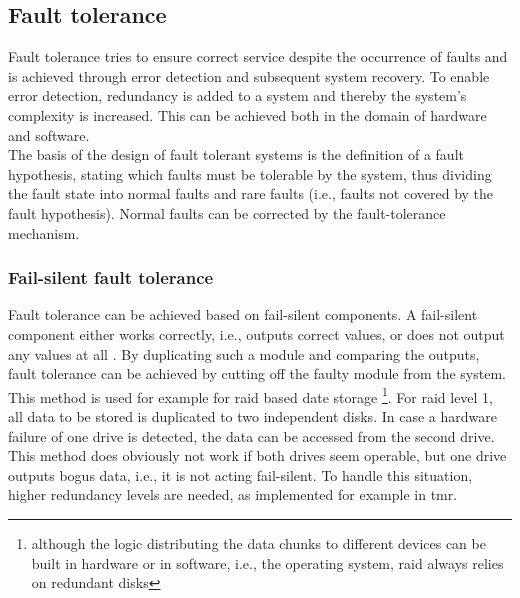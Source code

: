 \subsection{Fault tolerance}
Fault tolerance tries to ensure correct service despite the occurrence of faults and is achieved through error detection and subsequent system recovery.
To enable error detection, redundancy is added to a system and thereby the 
system's complexity is increased. This can be achieved both in the domain of hardware and software. 
\\
The basis of the design of fault tolerant systems is the definition of a fault hypothesis, stating which faults must be tolerable by the system, thus
dividing the fault state into normal faults and rare faults (i.e., faults not covered by the fault hypothesis). Normal faults can be corrected by the fault-tolerance
mechanism. 

\subsubsection{Fail-silent fault tolerance}
Fault tolerance can be achieved based on fail-silent components. A fail-silent component
either works correctly, i.e., outputs correct values, or does not output any values at all \cite{544479}. By duplicating such a module and comparing the
outputs, fault tolerance can be achieved by cutting off the faulty module from the system.
\\
This method is used for example for \gls{raid} based date storage \footnote{although the logic distributing
the data chunks to different devices can be built in hardware or in software, i.e., the operating system, \gls{raid} always relies on redundant disks}.
For \gls{raid} level 1, all data to be stored is duplicated to two independent disks. In case a hardware failure of one drive is detected, the data can be accessed
from the second drive. This method does obviously not work if both drives seem operable, but one drive outputs bogus data, i.e., it is not acting fail-silent.
To handle this situation, higher redundancy levels are needed, as implemented for example in \gls{tmr}. 

